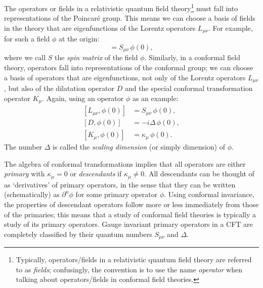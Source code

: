 \documentclass[12pt]{article}
\def\be{\begin{equation}}
\def\ee{\end{equation}}
\renewcommand{\^}[1]{\hat{#1}}
\begin{document}
The operators or fields in a relativistic quantum field theory\footnote{Typically, operators/fields in a relativistic quantum field theory are referred to as \emph{fields}; confusingly, the convention is to use the name \emph{operator} when talking about operators/fields in conformal field theories.} must fall into representations of the Poincar\'e group. This means we can choose a basis of fields in the theory that are eigenfunctions of the Lorentz operators $L_{\mu\nu}$.
For example, for such a field $\phi$ at the origin:
\be
 [L_{\mu\nu}, \phi(0)] = S_{\mu\nu}\, \phi(0),
\ee
where we call $S$ the \emph{spin matrix} of the field $\phi$. Similarly, in a conformal field theory, operators fall into representations of the conformal group; we can choose a basis of operators that are eigenfunctions, not only of the Lorentz operators $L_{\mu\nu}$, but also of the dilatation operator $D$ and the special conformal transformation operator $K_{\mu}$. Again, using an operator $\phi$ as an example:
\begin{align}
 \label{eq:L} [L_{\mu\nu}, \phi(0)] &= S_{\mu\nu}\, \phi(0),\\
  \label{eq:D} [D,\phi(0)] &= -i\Delta\, \phi(0),\\
 \label{eq:K} [K_{\mu},\phi(0)] &= \kappa_{\mu}\, \phi(0).
\end{align}
The number $\Delta$ is called the \emph{scaling dimension} (or simply dimension) of $\phi$. 

The algebra of conformal transformations implies that all operators are either \emph{primary} with $\kappa_{\mu}=0$ or \emph{descendants} if $\kappa_{\mu}\neq0$.
All descendants can be thought of as `derivatives' of primary operators, in the sense that they can be written (schematically) as $\partial^n \phi$ for some primary operator $\phi$. Using conformal invariance, the properties of descendant operators follow more or less immediately from those of the primaries; this means that a study of conformal field theories is typically a study of its primary operators. Gauge invariant primary operators in a CFT are completely classified by their quantum numbers $S_{\mu\nu}$ and $\Delta$.
\end{document}
